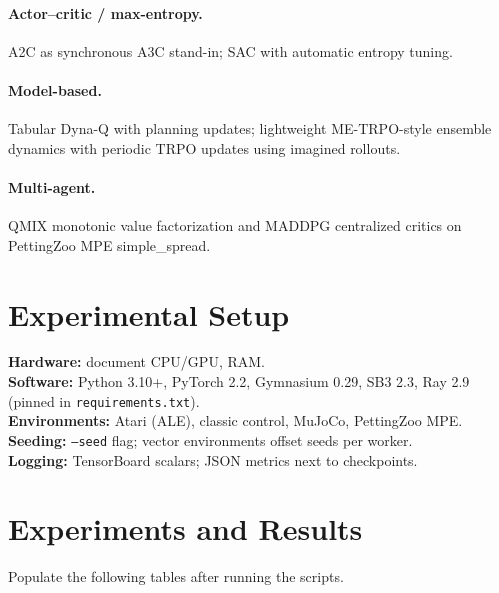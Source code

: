 \documentclass[12pt]{article}
\newcommand{\code}[1]{\texttt{#1}}
\begin{document}
\paragraph{Actor--critic / max-entropy.} A2C as synchronous A3C stand-in; SAC with automatic entropy tuning.
\paragraph{Model-based.} Tabular Dyna-Q with planning updates; lightweight ME-TRPO-style ensemble dynamics with periodic TRPO updates using imagined rollouts.
\paragraph{Multi-agent.} QMIX monotonic value factorization and MADDPG centralized critics on PettingZoo MPE simple\_spread.

\section{Experimental Setup}\label{sec:experimental}
\textbf{Hardware:} document CPU/GPU, RAM.\\
\textbf{Software:} Python 3.10+, PyTorch 2.2, Gymnasium 0.29, SB3 2.3, Ray 2.9 (pinned in \code{requirements.txt}).\\
\textbf{Environments:} Atari (ALE), classic control, MuJoCo, PettingZoo MPE.\\
\textbf{Seeding:} \code{--seed} flag; vector environments offset seeds per worker.\\
\textbf{Logging:} TensorBoard scalars; JSON metrics next to checkpoints.

\section{Experiments and Results}
Populate the following tables after running the scripts.
\end{document}
